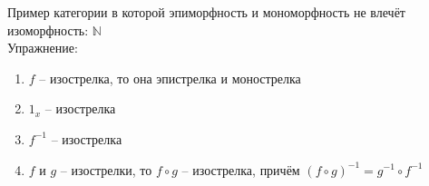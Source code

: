 \documentclass[a4paper, fleqn, draft]{report}
\begin{document}
Пример категории в которой эпиморфность и мономорфность не влечёт изоморфность:
$\mathbb{N}$ \\
Упражнение: \\
\begin{enumerate}
  \item $f$ -- изострелка, то она эпистрелка и монострелка \\
  \item $1_x$ -- изострелка \\
  \item $f^{-1}$ -- изострелка \\
  \item $f$ и $g$ -- изострелки, то $f \circ g$ -- изострелка, причём
        $(f \circ g)^{-1} = g^{-1} \circ f^{-1}$ \\
\end{enumerate}
\end{document}
